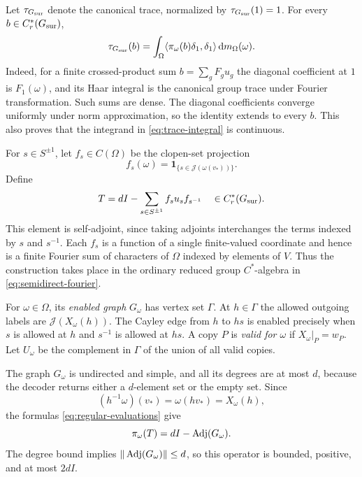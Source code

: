 Let $\tau_{G_{\mathrm{sur}}}$ denote the canonical trace, normalized by $\tau_{G_{\mathrm{sur}}}(1)=1$.
For every $b\in C_r^*(G_{\mathrm{sur}})$,
\begin{equation}
 \tau_{G_{\mathrm{sur}}}(b)=\int_\Omega
 \langle\pi_\omega(b)\delta_1,\delta_1\rangle\,
 \mathrm{d}m_\Omega(\omega).
 \label{eq:trace-integral}
\end{equation}
Indeed, for a finite crossed-product sum $b=\sum_g F_g u_g$ the diagonal
coefficient at $1$ is $F_1(\omega)$, and its Haar integral is the
canonical group trace under Fourier transformation.  Such sums are dense.
The diagonal coefficients converge uniformly under norm approximation,
so the identity extends to every $b$.  This also proves that the
integrand in \eqref{eq:trace-integral} is continuous.

For $s\in S^{\pm1}$, let $f_s\in C(\Omega)$ be the clopen-set projection
\[
 f_s(\omega)=\mathbf 1_{\{s\in\mathcal J(\omega(v_*))\}}.
\]
Define
\begin{equation}
 T=dI-\sum_{s\in S^{\pm1}}f_su_sf_{s^{-1}}
 \quad\in C_r^*(G_{\mathrm{sur}}).
 \label{eq:operator}
\end{equation}
This element is self-adjoint, since taking adjoints interchanges the
terms indexed by $s$ and $s^{-1}$.  Each $f_s$ is a function of a single
finite-valued coordinate and hence is a finite Fourier sum of characters
of $\Omega$ indexed by elements of $V$.  Thus the construction takes
place in the ordinary reduced group $C^*$-algebra in
\eqref{eq:semidirect-fourier}.

\begin{definition}
For $\omega\in\Omega$, its \emph{enabled graph} $G_\omega$ has vertex
set $\Gamma$.  At $h\in\Gamma$ the allowed outgoing labels are
$\mathcal J(X_\omega(h))$.  The Cayley edge from $h$ to $hs$ is enabled
precisely when $s$ is allowed at $h$ and $s^{-1}$ is allowed at $hs$.
A copy $P$ is \emph{valid for $\omega$} if $X_\omega|_P=w_P$.
Let $U_\omega$ be the complement in $\Gamma$ of the union of all valid
copies.
\end{definition}

The graph $G_\omega$ is undirected and simple, and all its degrees are
at most $d$, because the decoder returns either a $d$-element set or the
empty set.  Since
\[
 (h^{-1}\omega)(v_*)=\omega(hv_*)=X_\omega(h),
\]
the formulas \eqref{eq:regular-evaluations} give
\begin{equation}
 \pi_\omega(T)=dI-\operatorname{Adj}(G_\omega).
 \label{eq:enabled-operator}
\end{equation}
The degree bound implies $\|\operatorname{Adj}(G_\omega)\|\le d$, so this operator
is bounded, positive, and at most $2dI$.

